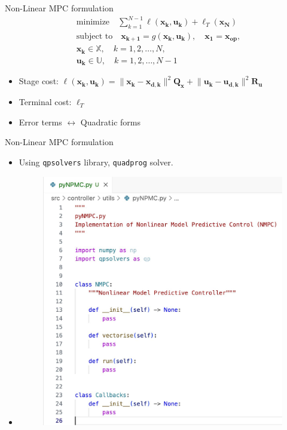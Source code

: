 \documentclass{beamer}
\begin{document}
\begin{frame}{Non-Linear MPC formulation}
\begin{equation*}
\begin{aligned}
    & \text{minimize} \quad \sum_{k=1}^{N-1} \ell(\mathbf{x_k}, \mathbf{u_k}) + \ell_T(\mathbf{x_N}) \\
    & \text{subject to} \quad \mathbf{x_{k+1}} = g(\mathbf{x_k}, \mathbf{u_k}), \quad \mathbf{x_1} = \mathbf{x_\text{op}}, \\
    & \mathbf{x_k} \in \mathbb{X}, \quad k = 1, 2, \dots, N, \\
    & \mathbf{u_k} \in \mathbb{U}, \quad k = 1, 2, \dots, N-1
\end{aligned}
\end{equation*}
\begin{itemize}
    \item Stage cost: $ \ell(\mathbf{x_k}, \mathbf{u_k}) = \lVert \mathbf{x_k} - \mathbf{x_{d, k}} \rVert ^ 2 \mathbf{Q_x} + \lVert \mathbf{u_k} - \mathbf{u_{d, k}} \rVert ^ 2 \mathbf{R_u}$
    \item Terminal cost: $ \ell_T $
    \item Error terms $\leftrightarrow$ Quadratic forms
\end{itemize}
\end{frame}


\begin{frame}{Non-Linear MPC formulation}
\begin{itemize}
    \item Using \texttt{qpsolvers} library, \texttt{quadprog} solver.
    \item 
\begin{figure}
    \centering
    \includegraphics[width=0.75\linewidth]{Presentation-2/WhatsApp Image 2024-09-30 at 17.18.57_d0017338.jpg}
  
\end{figure}
\end{itemize}
\end{frame}
\end{document}
